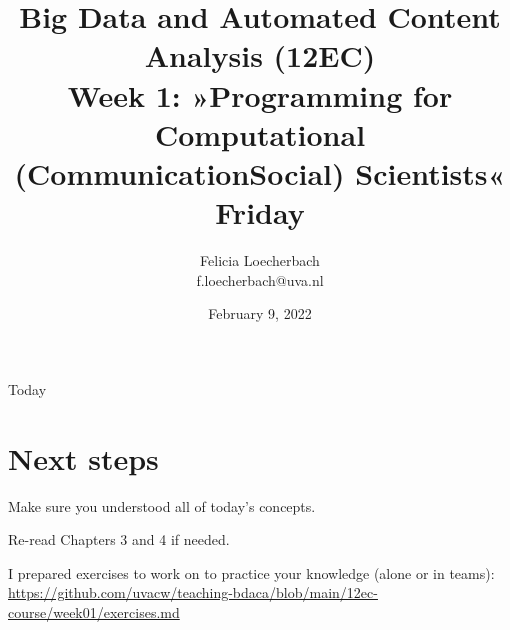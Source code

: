 \documentclass[compress]{beamer}
\begin{document}
\title[Big Data and Automated Content Analysis]{\textbf{Big Data and Automated Content Analysis (12EC)} 
\\Week 1: »Programming for Computational (Communication\textbar Social) Scientists«
\\Friday }
\author[Felicia Loecherbach]{Felicia Loecherbach\\ \footnotesize{f.loecherbach@uva.nl\\}}
\date{February 9, 2022}


\begin{frame}{}
	\titlepage
\end{frame}

\begin{frame}{Today}
	\tableofcontents
\end{frame}










\section{Next steps}




\begin{frame}[standout]
Make sure you understood all of today's concepts.

Re-read Chapters 3 and 4 if needed.

I prepared exercises to work on to practice your knowledge (alone or in teams):
\large{\url{https://github.com/uvacw/teaching-bdaca/blob/main/12ec-course/week01/exercises.md}}
\end{frame}





\begin{frame}
	\printbibliography
\end{frame}
\end{document}
